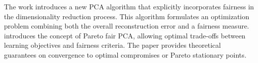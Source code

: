 The work \cite{Pelegrina2023} introduces a new PCA algorithm that explicitly incorporates fairness in the dimensionality reduction process. %
This algorithm formulates an optimization problem combining both the overall reconstruction error and a fairness measure. %
\cite{Kamani2022} introduces the concept of Pareto fair PCA, allowing optimal trade-offs between learning objectives and fairness criteria. The paper provides %
theoretical guarantees on convergence to optimal compromises or Pareto stationary points.

